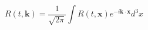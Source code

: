\begin{equation}\label{fourier}
R(t,\textbf{k})=\frac{1}{\sqrt{2\pi}}\int
R(t,\textbf{x})e^{-i\textbf{k}\cdot\textbf{x}}d^3x
\end{equation}

